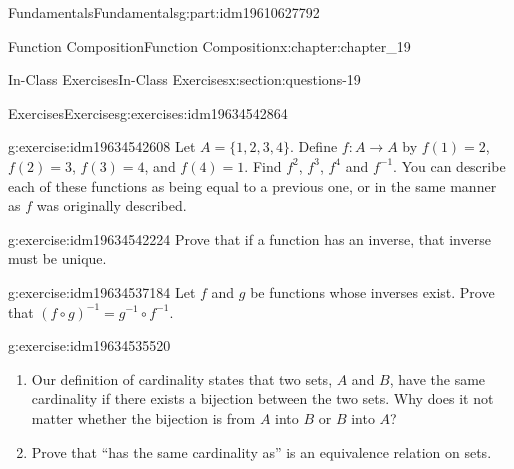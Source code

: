 \documentclass[oneside,10pt,]{book}
\numberwithin{equation}{section}
\begin{document}
\begin{partptx}{Fundamentals}{}{Fundamentals}{}{}{g:part:idm19610627792}
\begin{chapterptx}{Function Composition}{}{Function Composition}{}{}{x:chapter:chapter_19}
\begin{sectionptx}{In-Class Exercises}{}{In-Class Exercises}{}{}{x:section:questions-19}
%
%
%
\typeout{************************************************}
\typeout{************************************************}
%
\begin{exercises-subsection-numberless}{Exercises}{}{Exercises}{}{}{g:exercises:idm19634542864}
\par\medskip\noindent%
%
\begin{exercisegroup}
\begin{divisionexerciseeg}{1}{}{}{g:exercise:idm19634542608}%
Let \(A = \{1, 2, 3, 4\}\). Define \(f:A\rightarrow A\) by \(f(1) = 2\), \(f(2) = 3\), \(f(3) = 4\), and \(f(4) = 1\). Find \(f^2\), \(f^3\), \(f^4\) and \(f^{-1}\).  You can describe each of these functions as being equal to a previous one, or in the same manner as \(f\) was originally described.%
\end{divisionexerciseeg}%
\begin{divisionexerciseeg}{2}{}{}{g:exercise:idm19634542224}%
Prove that if a function has an inverse, that inverse must be unique.%
\end{divisionexerciseeg}%
\begin{divisionexerciseeg}{3}{}{}{g:exercise:idm19634537184}%
Let \(f\) and \(g\) be functions whose inverses exist. Prove that \((f\circ g)^{-1}= g^{-1}\circ f^{-1}\).%
\end{divisionexerciseeg}%
\begin{divisionexerciseeg}{4}{}{}{g:exercise:idm19634535520}%
%
\begin{enumerate}[label=(\alph*)]
\item{}Our definition of cardinality states that two sets, \(A\) and \(B\), have the same cardinality if there exists a bijection between the two sets. Why does it not matter whether the bijection is from \(A\) into \(B\) or \(B\) into \(A\)?%
\item{}Prove that ``has the same cardinality as'' is an equivalence relation on sets.%
\end{enumerate}
%
\end{divisionexerciseeg}%
\end{exercisegroup}
\par\medskip\noindent
\end{exercises-subsection-numberless}
\end{sectionptx}
\end{chapterptx}
%
\typeout{************************************************}
\typeout{************************************************}

\end{partptx}
\end{document}
